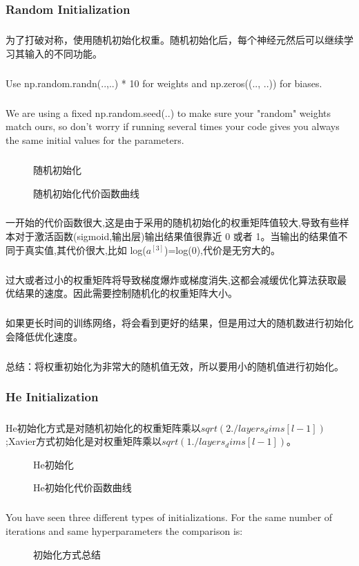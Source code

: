 \documentclass{article}
\begin{document}
\begin{CJK}{UTF8}{gbsn}
\subsubsection{Random Initialization}
\subparagraph{}
为了打破对称，使用随机初始化权重。随机初始化后，每个神经元然后可以继续学习其输入的不同功能。
\subparagraph{}
Use np.random.randn(..,..) * 10 for weights and np.zeros((.., ..)) for biases.
\subparagraph{}
We are using a fixed np.random.seed(..) to make sure your "random" weights match ours, so don't worry if running several times your code gives you always the same initial values for the parameters. 
\subparagraph{}
\begin{figure}[H]
\label{fig:12}
\caption{随机初始化}
\end{figure}
\begin{figure}[H]
\label{fig:14}
\caption{随机初始化代价函数曲线}
\end{figure}
\subparagraph{}
一开始的代价函数很大,这是由于采用的随机初始化的权重矩阵值较大,导致有些样本对于激活函数(sigmoid,输出层)输出结果值很靠近 0 或者 1。当输出的结果值不同于真实值,其代价很大,比如 log($a^{[3]}$)=log(0),代价是无穷大的。
\subparagraph{}
过大或者过小的权重矩阵将导致梯度爆炸或梯度消失,这都会减缓优化算法获取最优结果的速度。因此需要控制随机化的权重矩阵大小。
\subparagraph{}
如果更长时间的训练网络，将会看到更好的结果，但是用过大的随机数进行初始化会降低优化速度。
\subparagraph{}
总结：将权重初始化为非常大的随机值无效，所以要用小的随机值进行初始化。
\subsubsection{He Initialization}
\subparagraph{}
He初始化方式是对随机初始化的权重矩阵乘以$sqrt(2./layers_dims[l-1])$;Xavier方式初始化是对权重矩阵乘以$sqrt(1./layers_dims[l-1])$。
\begin{figure}[H]
\label{fig:15}
\caption{He初始化}
\end{figure}
\begin{figure}[H]
\label{fig:16}
\caption{He初始化代价函数曲线}
\end{figure}
\subparagraph{}
You have seen three different types of initializations. For the same number of iterations and same hyperparameters the comparison is:
\begin{figure}[H]
\label{fig:17}
\caption{初始化方式总结}
\end{figure}

\end{CJK}
\end{document}
